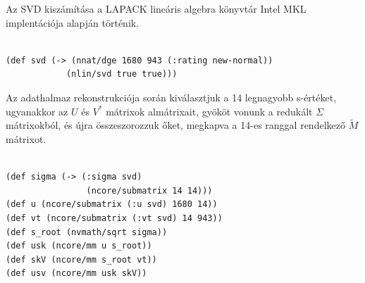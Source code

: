 \documentclass[final, 12pt] {ubb_dolgozat}{book}
\begin{document}
Az SVD kiszámítása a LAPACK lineáris algebra könyvtár Intel MKL implentációja alapján történik.

\begin{verbatim}

(def svd (-> (nnat/dge 1680 943 (:rating new-normal))
            (nlin/svd true true)))

\end{verbatim}

Az adathalmaz rekonstrukciója során kiválasztjuk a 14 legnagyobb s-értéket, ugyanakkor az \(U\) és \(V^{*}\) mátrixok almátrixait, gyököt vonunk a
redukált \(\Sigma\) mátrixokból, és újra összeszorozzuk őket, megkapva a 14-es ranggal rendelkező \(\widetilde{M}\) mátrixot.

\begin{verbatim}

(def sigma (-> (:sigma svd)
                (ncore/submatrix 14 14)))
(def u (ncore/submatrix (:u svd) 1680 14))
(def vt (ncore/submatrix (:vt svd) 14 943))
(def s_root (nvmath/sqrt sigma))
(def usk (ncore/mm u s_root))
(def skV (ncore/mm s_root vt))
(def usv (ncore/mm usk skV))

\end{verbatim}



\end{document}
